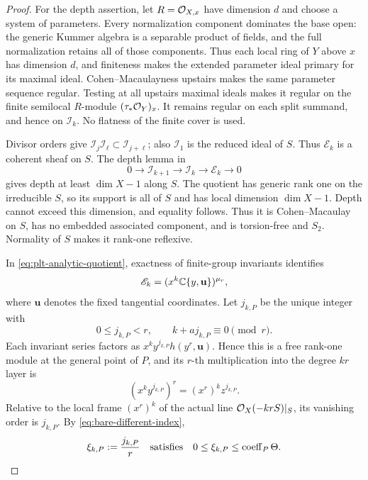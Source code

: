 \begin{proof}
For the depth assertion, let \(R=\mathcal O_{X,x}\) have dimension \(d\) and
choose a system of parameters.  Every normalization component dominates
the base open: the generic Kummer algebra is a separable product of
fields, and the full normalization retains all of those components.
Thus each local ring of \(Y\) above \(x\) has dimension \(d\), and
finiteness makes the extended parameter ideal primary for its maximal
ideal.  Cohen--Macaulayness upstairs
makes the same parameter sequence regular.  Testing at all upstairs
maximal ideals makes it regular on the finite semilocal \(R\)-module
\((\tau_*\mathcal O_Y)_x\).  It remains regular on each split summand, and
hence on \(\mathscr I_k\).  No flatness of the finite cover is used.

Divisor orders give
\(\mathscr I_j\mathscr I_\ell\subset\mathscr I_{j+\ell}\); also
\(\mathscr I_1\) is the reduced ideal of \(S\).  Thus
\(\mathscr E_k\) is a coherent sheaf on \(S\).  The depth lemma in
\[
 0\longrightarrow\mathscr I_{k+1}\longrightarrow\mathscr I_k
 \longrightarrow\mathscr E_k\longrightarrow0
\]
gives depth at least \(\dim X-1\) along \(S\).  The quotient has
generic rank one on the irreducible \(S\), so its support is all of
\(S\) and has local dimension \(\dim X-1\).  Depth cannot exceed
this dimension, and equality follows.  Thus it is Cohen--Macaulay on
\(S\), has no embedded associated
component, and is torsion-free and \(S_2\).  Normality of \(S\) makes
it rank-one reflexive.

In \eqref{eq:plt-analytic-quotient}, exactness of finite-group invariants
identifies
\[
 \mathscr E_k=(x^k\mathbb C\{y,\mathbf u\})^{\mu_r},
\]
where \(\mathbf u\) denotes the fixed tangential coordinates.  Let
\(j_{k,P}\) be the unique integer with
\[
 0\leq j_{k,P}<r,\qquad k+a j_{k,P}\equiv0\pmod r .
\]
Each invariant series factors as
\(x^k y^{j_{k,P}}h(y^r,\mathbf u)\).  Hence this is a free rank-one
module at the general point of \(P\), and its \(r\)-th multiplication
into the degree \(kr\) layer is
\[
 (x^k y^{j_{k,P}})^r=(x^r)^k z^{j_{k,P}} .
\]
Relative to the local frame \((x^r)^k\) of the actual line
\(\mathcal O_X(-krS)|_S\), its vanishing order is \(j_{k,P}\).  By
\eqref{eq:bare-different-index},
\begin{equation}\label{eq:conormal-local-defect}
 \xi_{k,P}:=\frac{j_{k,P}}r
 \quad\hbox{satisfies}\quad
 0\leq\xi_{k,P}\leq\operatorname{coeff}_P\Theta .
\end{equation}


\end{proof}
